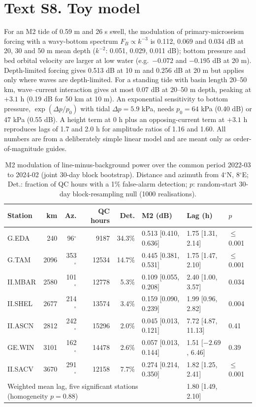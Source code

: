 \documentclass[11pt]{article}
\newcommand{\degr}{\ensuremath{^\circ}}
\begin{document}
\section*{Text S8. Toy model}
For an M2 tide of 0.59 m and 26 s swell, the modulation of primary-microseism forcing with a wavy-bottom spectrum $F_B\propto k^{-3}$ is 0.112, 0.069 and 0.034 dB at 20, 30 and 50 m mean depth ($k^{-2}$: 0.051, 0.029, 0.011 dB); bottom pressure and bed orbital velocity are larger at low water (e.g.\ $-0.072$ and $-0.195$ dB at 20 m). Depth-limited forcing gives 0.513 dB at 10 m and 0.256 dB at 20 m but applies only where waves are depth-limited. For a standing tide with basin length 20--50 km, wave--current interaction gives at most 0.07 dB at 20--50 m depth, peaking at $+3.1$ h (0.19 dB for 50 km at 10 m). An exponential sensitivity to bottom pressure, $\exp(\Delta p/p_0)$ with tidal $\Delta p=5.9$ kPa, needs $p_0=64$ kPa (0.40 dB) or 47 kPa (0.55 dB). A height term at 0 h plus an opposing-current term at $+3.1$ h reproduces lags of 1.7 and 2.0 h for amplitude ratios of 1.16 and 1.60. All numbers are from a deliberately simple linear model and are meant only as order-of-magnitude guides.

\begin{table}[h]
\centering\small
\caption{M2 modulation of line-minus-background power over the common period 2022-03 to 2024-02 (joint 30-day block bootstrap). Distance and azimuth from 4\degr N, 8\degr E; Det.: fraction of QC hours with a 1\% false-alarm detection; $p$: random-start 30-day block-resampling null (1000 realisations).}
\label{tab:multi}
\begin{tabular}{lrrrrlll}
\toprule
Station & km & Az. & QC hours & Det. & M2 (dB) & Lag (h) & $p$ \\
\midrule
G.EDA   & 240  & 96\degr  & 9187  & 34.3\% & 0.513 [0.410, 0.636] & 1.75 [1.31, 2.14] & $\le$0.001 \\
G.TAM   & 2096 & 353\degr & 12534 & 14.7\% & 0.445 [0.381, 0.531] & 1.75 [1.47, 2.10] & $\le$0.001 \\
II.MBAR & 2580 & 101\degr & 12778 & 5.3\%  & 0.109 [0.055, 0.208] & 2.40 [1.00, 3.57] & 0.034 \\
II.SHEL & 2677 & 214\degr & 13574 & 3.4\%  & 0.159 [0.090, 0.239] & 1.99 [0.96, 2.82] & 0.004 \\
II.ASCN & 2812 & 242\degr & 15296 & 2.0\%  & 0.045 [0.013, 0.121] & 7.72 [4.87, 11.13] & 0.41 \\
GE.WIN  & 3101 & 162\degr & 14478 & 2.6\%  & 0.057 [0.013, 0.144] & 1.51 [$-2.69$, 6.46] & 0.39 \\
II.SACV & 3670 & 291\degr & 12158 & 7.7\%  & 0.274 [0.214, 0.350] & 1.82 [1.25, 2.41] & $\le$0.001 \\
\midrule
\multicolumn{6}{l}{Weighted mean lag, five significant stations (homogeneity $p=0.88$)} & 1.80 [1.49, 2.10] & \\
\bottomrule
\end{tabular}
\end{table}
\end{document}
